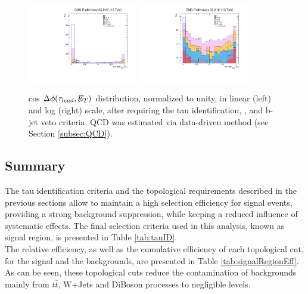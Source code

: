  \begin{figure}[H]
 \begin{center}
 \captionsetup[subfloat]{farskip=0pt,captionskip=0.0cm,labelformat=empty}
 \includegraphics[clip,width=0.43\textwidth]{figuras/Chapter5/TauID_Plots/EventSelection_cosDphiTauMET.pdf}
 \includegraphics[clip,width=0.43\textwidth]{figuras/Chapter5/TauID_Plots/EventSelection_cosDphiTauMET_log.pdf}
 \end{center}
 \caption{cos $\Delta \phi (\tau_{lead},\not\!\!E_T)$ distribution, normalized to unity, in linear (left) and log (right) scale, after requiring
 the tau identification, \MET, and b-jet veto criteria. QCD was estimated via data-driven method (see Section \ref{subsec:QCD}).}
 \label{cosDphiTauMET}
 \end{figure}
 


\subsection{Summary}
\label{subsec:SignalRegion}

\noindent The tau identification criteria and the topological requirements described 
in the previous sections allow to maintain a high selection efficiency 
for signal events, providing a strong background suppression, while 
keeping a reduced influence of systematic effects. The final selection 
criteria used in this analysis, known as signal region, is presented in 
Table \ref{tab:tauID}.\\

\noindent The relative efficiency, as well as the cumulative efficiency
of each topological cut, for the signal and the backgrounds,
are presented in Table \ref{tab:signalRegionEff}. As can be seen, 
these topological cuts reduce the contamination of backgrounds mainly from
$t\bar{t}$, W+Jets and DiBoson processes to negligible levels.\\

